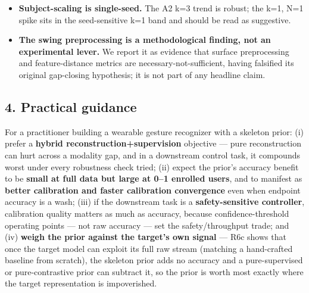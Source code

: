 \begin{itemize}
  \item \textbf{Subject-scaling is single-seed.} The A2 k=3 trend is robust; the k=1, N=1 spike sits in the seed-sensitive k=1 band and should be read as suggestive.
  \item \textbf{The swing preprocessing is a methodological finding, not an experimental lever.} We report it as evidence that surface preprocessing and feature-distance metrics are necessary-not-sufficient, having falsified its original gap-closing hypothesis; it is not part of any headline claim.
\end{itemize}

\subsection{4. Practical guidance}

For a practitioner building a wearable gesture recognizer with a skeleton prior: (i) prefer a \textbf{hybrid reconstruction+supervision} objective --- pure reconstruction can hurt across a modality gap, and in a downstream control task, it compounds worst under every robustness check tried; (ii) expect the prior's accuracy benefit to be \textbf{small at full data but large at 0--1 enrolled users}, and to manifest as \textbf{better calibration and faster calibration convergence} even when endpoint accuracy is a wash; (iii) if the downstream task is a \textbf{safety-sensitive controller}, calibration quality matters as much as accuracy, because confidence-threshold operating points --- not raw accuracy --- set the safety/throughput trade; and (iv) \textbf{weigh the prior against the target's own signal} --- R6c shows that once the target model can exploit its full raw stream (matching a hand-crafted baseline from scratch), the skeleton prior adds no accuracy and a pure-supervised or pure-contrastive prior can subtract it, so the prior is worth most exactly where the target representation is impoverished.
